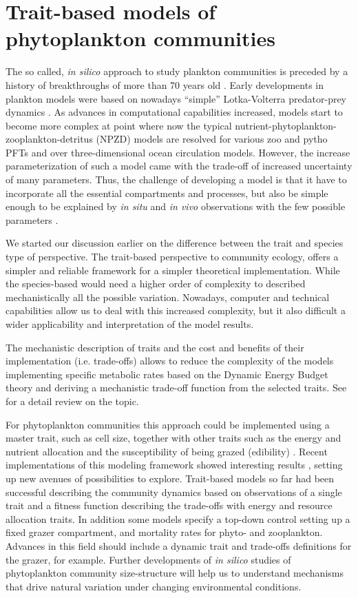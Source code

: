 \section{Trait-based models of phytoplankton communities}
The so called, \textit{in silico} approach to study plankton communities is preceded by a history of breakthroughs of more than 70 years old \citep{Gentleman2002}. Early developments in plankton models were based on nowadays “simple” Lotka-Volterra predator-prey dynamics \citep{Fleming1939}. As advances in computational capabilities increased, models start to become more complex at point where now the typical nutrient-phytoplankton-zooplankton-detritus (NPZD) models are resolved for various zoo and pytho PFTs and over three-dimensional ocean circulation models. However, the increase parameterization of such a model came with the trade-off of increased uncertainty of many parameters. Thus, the challenge of developing a model is that it have to incorporate all the essential compartments and processes, but also be simple enough to be explained by \textit{in situ} and \textit{in vivo} observations with the few possible parameters \citep{Anderson2010}.

We started our discussion earlier on the difference between the trait and species type of perspective. The trait-based perspective to community ecology, offers a simpler and reliable framework for a simpler theoretical implementation. While the species-based would need a higher order of complexity to described mechanistically all the possible variation. Nowadays, computer and technical capabilities allow us to deal with this increased complexity, but it also difficult a wider applicability and interpretation of the model results.

The mechanistic description of traits and the cost and benefits of their implementation (i.e. trade-offs) allows to reduce the complexity of the models implementing specific metabolic rates based on the Dynamic Energy Budget theory \citep{Kooijman2009} and deriving a mechanistic trade-off function from the selected traits\citep{Merico2009}. See \citet{Follows2011} for a detail review on the topic.

For phytoplankton communities this approach could be implemented using a master trait, such as cell size, together with other traits such as the energy and nutrient allocation and the susceptibility of being grazed (edibility) \citep{Litchman2008,Follows2011}. Recent implementations of this modeling framework showed interesting results \citep{Bruggeman2007, Merico2009}, setting up new avenues of possibilities to explore. Trait-based models so far had been successful describing the community dynamics based on observations of a single trait and a fitness function describing the trade-offs with energy and resource allocation traits. In addition some models specify a top-down control setting up a fixed grazer compartment, and mortality rates for phyto- and zooplankton. Advances in this field should include a dynamic trait and trade-offs definitions for the grazer, for example. Further developments of \textit{in silico} studies of phytoplankton community size-structure will help us to understand mechanisms that drive natural variation under changing environmental conditions.

